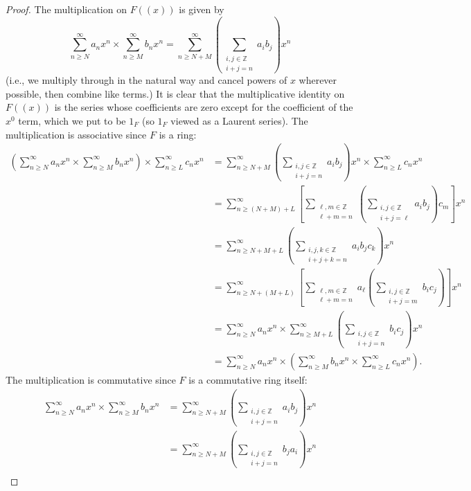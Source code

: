\documentclass[11pt]{article}
\newcommand{\br}[1]{\left(#1\right)}
\newcommand{\sbr}[1]{\left[#1\right]}
\begin{document}
\begin{enumerate}
\begin{enumerate}
\begin{proof}
            The multiplication on $F((x))$ is given by \[\sum_{n\geq N}^\infty a_nx^n\times \sum_{n\geq M}^\infty b_nx^n = \sum_{n\geq N+M}^\infty\br{\sum_{\substack{i,j\in\mathbb{Z} \\ i+j = n}} a_ib_j}x^n\] (i.e., we multiply through in the natural way and cancel powers of $x$ wherever possible, then combine like terms.) It is clear that the multiplicative identity on $F((x))$ is the series whose coefficients are zero except for the coefficient of the $x^0$ term, which we put to be $1_F$ (so $1_F$ viewed as a Laurent series). The multiplication is associative since $F$ is a ring: \begin{align*}
                \br{\sum_{n\geq N}^\infty a_nx^n\times \sum_{n\geq M}^\infty b_nx^n }\times \sum_{n\geq L}^\infty c_nx^n &= \sum_{n\geq N+M}^\infty\br{\sum_{\substack{i,j\in\mathbb{Z} \\ i+j = n}} a_ib_j}x^n\times \sum_{n\geq L}^\infty c_nx^n\\
                &= \sum_{n\geq (N+M) + L}^\infty\sbr{\sum_{\substack{\ell,m\in \mathbb{Z} \\ \ell+m = n}}\br{\sum_{\substack{i,j\in\mathbb{Z}\\i+j = \ell}}a_ib_j}c_m}x^n\\
                &= \sum_{n\geq N+M+L}^\infty\br{\sum_{\substack{i,j,k\in\mathbb{Z}\\i+j+k = n}}a_ib_jc_k}x^n\\
                &= \sum_{n\geq N+(M + L)}^\infty\sbr{\sum_{\substack{\ell,m\in \mathbb{Z} \\ \ell+m = n}}a_\ell \br{\sum_{\substack{i,j\in\mathbb{Z}\\i+j = m}}b_ic_j}}x^n\\
                &= \sum_{n\geq N}^\infty a_nx^n\times\sum_{n\geq M+L}^\infty\br{\sum_{\substack{i,j\in\mathbb{Z} \\ i+j = n}} b_ic_j}x^n \\
                &= \sum_{n\geq N}^\infty a_nx^n\times\br{\sum_{n\geq M}^\infty b_nx^n\times \sum_{n\geq L}^\infty c_nx^n}.
            \end{align*}
            The multiplication is commutative since $F$ is a commutative ring itself: \begin{align*}
                \sum_{n\geq N}^\infty a_nx^n\times \sum_{n\geq M}^\infty b_nx^n &= \sum_{n\geq N+M}^\infty\br{\sum_{\substack{i,j\in\mathbb{Z} \\ i+j = n}} a_ib_j}x^n\\
                &= \sum_{n\geq N+M}^\infty\br{\sum_{\substack{i,j\in\mathbb{Z} \\ i+j = n}} b_ja_i}x^n\\

\end{align*}
\end{proof}
\end{enumerate}
\end{enumerate}
\end{document}
